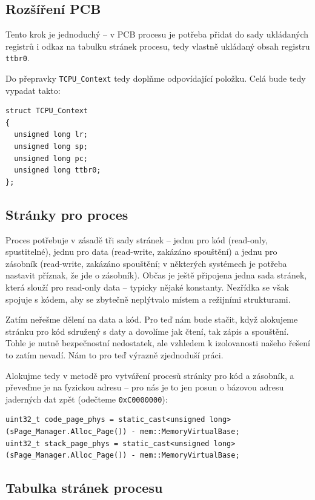 \documentclass{article}
\begin{document}
\subsection{Rozšíření PCB}

Tento krok je jednoduchý -- v PCB procesu je potřeba přidat do sady ukládaných registrů i odkaz na tabulku stránek procesu, tedy vlastně ukládaný obsah registru {\tt ttbr0}.

Do přepravky {\tt TCPU\_Context} tedy doplňme odpovídající položku. Celá bude tedy vypadat takto:
\begin{lstlisting}
struct TCPU_Context
{
  unsigned long lr;
  unsigned long sp;
  unsigned long pc;
  unsigned long ttbr0;
};
\end{lstlisting}

\subsection{Stránky pro proces}

Proces potřebuje v zásadě tři sady stránek -- jednu pro kód (read-only, spustitelné), jednu pro data (read-write, zakázáno spouštění) a jednu pro zásobník (read-write, zakázáno spouštění; v některých systémech je potřeba nastavit příznak, že jde o zásobník). Občas je ještě připojena jedna sada stránek, která slouží pro read-only data -- typicky nějaké konstanty. Nezřídka se však spojuje s kódem, aby se zbytečně neplýtvalo místem a režijními strukturami.

Zatím neřešme dělení na data a kód. Pro teď nám bude stačit, když alokujeme stránku pro kód sdružený s daty a dovolíme jak čtení, tak zápis a spouštění. Tohle je nutně bezpečnostní nedostatek, ale vzhledem k izolovanosti našeho řešení to zatím nevadí. Nám to pro teď výrazně zjednoduší práci.

Alokujme tedy v metodě pro vytváření procesů stránky pro kód a zásobník, a převeďme je na fyzickou adresu -- pro nás je to jen posun o bázovou adresu jaderných dat zpět (odečteme {\tt 0xC0000000}):
\begin{lstlisting}
uint32_t code_page_phys = static_cast<unsigned long>(sPage_Manager.Alloc_Page()) - mem::MemoryVirtualBase;
uint32_t stack_page_phys = static_cast<unsigned long>(sPage_Manager.Alloc_Page()) - mem::MemoryVirtualBase;
\end{lstlisting}

\subsection{Tabulka stránek procesu}
\end{document}
